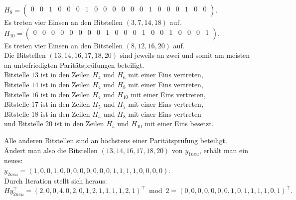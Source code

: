 \begin{Beispiel}
    $H_8=\left( \begin{array}{rrrrrrrrrrrrrrrrrrrr}
        0 & 0 & 1 & 0 & 0 & 0 & 1 & 0 & 0 & 0 & 0 & 0 & 0 & 1 & 0 & 0 & 0 & 1 & 0 & 0 \\
       \end{array}\right). 
    $\\
    Es treten vier Einsen an den Bitstellen $(3, 7, 14, 18)$ auf.\\
    
    $H_{10}=\left( \begin{array}{rrrrrrrrrrrrrrrrrrrr}
        0 & 0 & 0 & 0 & 0 & 0 & 0 & 0 & 1 & 0 & 0 & 0 & 1 & 0 & 0 & 1 & 0 & 0 & 0 & 1 \\
       \end{array}\right). 
    $\\
    Es treten vier Einsen an den Bitstellen $(8, 12, 16, 20)$ auf.\\
    
    
    Die Bitstellen $(13, 14, 16, 17, 18, 20)$ sind jeweils an zwei und somit am meisten an unbefriedigten Paritätsprüfungen beteiligt.\\ 
    Bitstelle $13$ ist in den Zeilen $H_4$ und $H_6$ mit einer Eins vertreten,\\
    Bitstelle $14$ ist in den Zeilen $H_4$ und $H_8$  mit einer Eins vertreten,\\
    Bitstelle $16$ ist in den Zeilen $H_4$ und $H_{10}$  mit einer Eins vertreten,\\ 
    Bitstelle $17$ ist in den Zeilen $H_5$ und $H_7$ mit einer Eins vertreten,\\
    Bitstelle $18$ ist in den Zeilen $H_5$ und $H_8$ mit einer Eins vertreten\\    
    und Bitstelle $20$ ist in den Zeilen $H_5$ und $H_{10}$ mit einer Eins besetzt.\\
    \pagebreak
    
    Alle anderen Bitstellen sind an höchstens einer Paritätsprüfung beteiligt.\\
    Ändert man also die Bitstellen $(13, 14, 16, 17, 18, 20)$ von $y_{1neu}$, erhält man ein neues:\\
    $y_{2neu} = (1,0,0,1,0,0,0,0,0,0,0,0,1,1,1,1,0,0,0,0).$\\
    
    Durch Iteration stellt sich heraus:\\
    $Hy_{2neu}^\intercal= (2,0,0,4,0,2,0,1,2,1,1,1,1,2,1)^\intercal \bmod 2= (0,0,0,0,0,0,0,1,0,1,1,1,1,0,1)^\intercal.$\\
    

\end{Beispiel}
